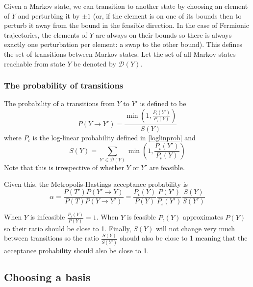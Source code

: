 \documentclass{article}
\begin{document}
Given a Markov state, we can transition to another state by choosing an element of  $Y$ and perturbing it by $\pm 1$ (or, if the element is on one of its bounds then to perturb it away from the bound in the feasible direction. In the case of Fermionic trajectories, the elements of $Y$ are always on their bounds so there is always exactly one perturbation per element: a swap to the other bound). This defines the set of transitions between Markov states. Let the set of all Markov states reachable from state $Y$ be denoted by $\mathcal{D}(Y)$. 

\subsubsection{The probability of transitions}

The probability of a transitions from $Y$ to $Y'$ is defined to be
\[
P(Y \to Y') = \frac{\min\left(1, \frac{P_\iota(Y')}{P_\iota(Y)}\right)}{S(Y)} 
\]
where $P_\iota$ is the log-linear probability defined in \eqref{loglinprob} and
\[
S(Y) = \sum_{Y'\in \mathcal{D}(Y)}\min\left(1, \frac{P_\iota(Y')}{P_\iota(Y)}\right)
\]
Note that this is irrespective of whether $Y$ or $Y'$ are feasible.

Given this, the Metropolis-Hastings acceptance probability is
\[
\alpha = \frac{P(T')P(Y' \to Y)}{P(T)P(Y \to Y')} = 
\frac{P_\iota(Y)}{P(Y)} \frac{P(Y')}{P_\iota(Y')}  \frac{S(Y)}{S(Y')}
\]

When $Y$ is infeasible $\frac{P_\iota(Y)}{P(Y)} = 1$. When $Y$ is feasible $P_\iota(Y)$ approximates $P(Y)$ so their ratio should be close to 1. Finally, $S(Y)$ will not change very much between transitions so the ratio $ \frac{S(Y)}{S(Y')}$ should also be close to 1 meaning that the acceptance probability should also be close to 1.

\subsection{Choosing a basis}
\end{document}
